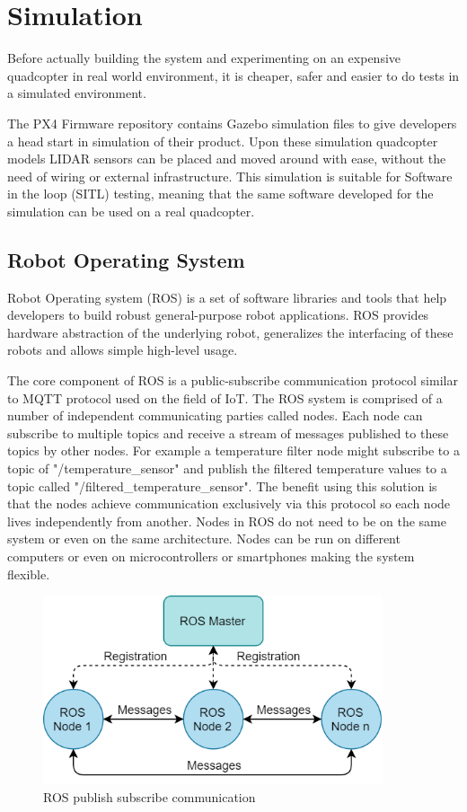 \chapter{Simulation}
Before actually building the system and experimenting on an expensive quadcopter in real world environment,
it is cheaper, safer and easier to do tests in a simulated environment. 

The PX4 Firmware repository\cite{PX4Repository} contains Gazebo simulation files to give developers a head 
start in simulation of their product. Upon these simulation quadcopter models LIDAR sensors can be placed and 
moved around with ease, without the need of wiring or external infrastructure. This simulation is 
suitable for Software in the loop (SITL) testing, meaning that the same software developed for the simulation
can be used on a real quadcopter.



\section{Robot Operating System}
Robot Operating system (ROS) is a set of software libraries and tools that help developers to build robust 
general-purpose robot applications\cite{ROSWebsite}. ROS provides hardware abstraction of the underlying 
robot, generalizes the interfacing of these robots and allows simple high-level usage.


The core component of ROS is a public-subscribe communication protocol similar to MQTT protocol
used on the field of IoT. The ROS system is comprised of a number of independent communicating parties called 
nodes. Each node can subscribe to multiple topics and receive a stream of messages published to these topics 
by other nodes. For example a temperature filter node might subscribe to a topic of "/temperature\_sensor" 
and publish the filtered temperature values to a topic called "/filtered\_temperature\_sensor". 
The benefit using this solution is that the nodes achieve communication exclusively via this protocol 
so each node lives independently from another. Nodes in ROS do not need to be on the same system or 
even on the same architecture. Nodes can be run on different computers or even on microcontrollers or 
smartphones making the system flexible.

\begin{figure}[!ht]
    \centering
    \includegraphics[width=100mm, keepaspectratio]{figures/ros_pubsub.png}
    \caption{ROS publish subscribe communication}
    \label{fig:ros_pubsub}
\end{figure}

